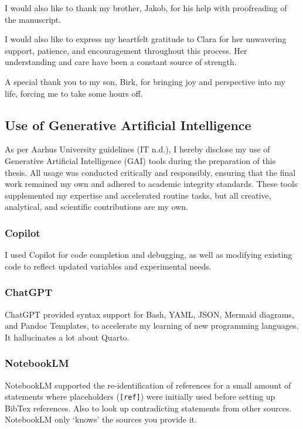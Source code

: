 \documentclass[
  11pt,
  a4paper,
]{scrbook}
\begin{document}
I would also like to thank my brother, Jakob, for his help with
proofreading of the manuscript.

I would also like to express my heartfelt gratitude to Clara for her
unwavering support, patience, and encouragement throughout this process.
Her understanding and care have been a constant source of strength.

A special thank you to my son, Birk, for bringing joy and perspective
into my life, forcing me to take some hours off.

\subsection{Use of Generative Artificial
Intelligence}\label{use-of-generative-artificial-intelligence}

As per Aarhus University guidelines (IT n.d.), I hereby disclose my use
of Generative Artificial Intelligence (GAI) tools during the preparation
of this thesis. All usage was conducted critically and responsibly,
ensuring that the final work remained my own and adhered to academic
integrity standards. These tools supplemented my expertise and
accelerated routine tasks, but all creative, analytical, and scientific
contributions are my own.

\subsubsection{Copilot}\label{copilot}

I used Copilot for code completion and debugging, as well as modifying
existing code to reflect updated variables and experimental needs.

\subsubsection{ChatGPT}\label{chatgpt}

ChatGPT provided syntax support for Bash, YAML, JSON, Mermaid diagrams,
and Pandoc Templates, to accelerate my learning of new programming
languages. It hallucinates a lot about Quarto.

\subsubsection{NotebookLM}\label{notebooklm}

NotebookLM supported the re-identification of references for a small
amount of statements where placeholders (\texttt{{[}ref{]}}) were
initially used before setting up BibTex references. Also to look up
contradicting statements from other sources. NotebookLM only `knows' the
sources you provide it.


\backmatter
\end{document}

